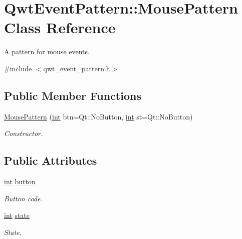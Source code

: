 \hypertarget{class_qwt_event_pattern_1_1_mouse_pattern}{\section{Qwt\-Event\-Pattern\-:\-:Mouse\-Pattern Class Reference}
\label{class_qwt_event_pattern_1_1_mouse_pattern}
}


A pattern for mouse events.  




{\ttfamily \#include $<$qwt\-\_\-event\-\_\-pattern.\-h$>$}

\subsection*{Public Member Functions}
\begin{DoxyCompactItemize}
\item 
\hyperlink{class_qwt_event_pattern_1_1_mouse_pattern_ac95c34a2df97bcce20cad1cbcd3ca8ed}{Mouse\-Pattern} (\hyperlink{ioapi_8h_a787fa3cf048117ba7123753c1e74fcd6}{int} btn=Qt\-::\-No\-Button, \hyperlink{ioapi_8h_a787fa3cf048117ba7123753c1e74fcd6}{int} st=Qt\-::\-No\-Button)
\begin{DoxyCompactList}\small\item\em Constructor. \end{DoxyCompactList}\end{DoxyCompactItemize}
\subsection*{Public Attributes}
\begin{DoxyCompactItemize}
\item 
\hyperlink{ioapi_8h_a787fa3cf048117ba7123753c1e74fcd6}{int} \hyperlink{class_qwt_event_pattern_1_1_mouse_pattern_a517f3df018a531121c2205044ebe08d4}{button}
\begin{DoxyCompactList}\small\item\em Button code. \end{DoxyCompactList}\item 
\hyperlink{ioapi_8h_a787fa3cf048117ba7123753c1e74fcd6}{int} \hyperlink{class_qwt_event_pattern_1_1_mouse_pattern_a2fa8afdd823b259234dba054d9394727}{state}
\begin{DoxyCompactList}\small\item\em State. \end{DoxyCompactList}\end{DoxyCompactItemize}


